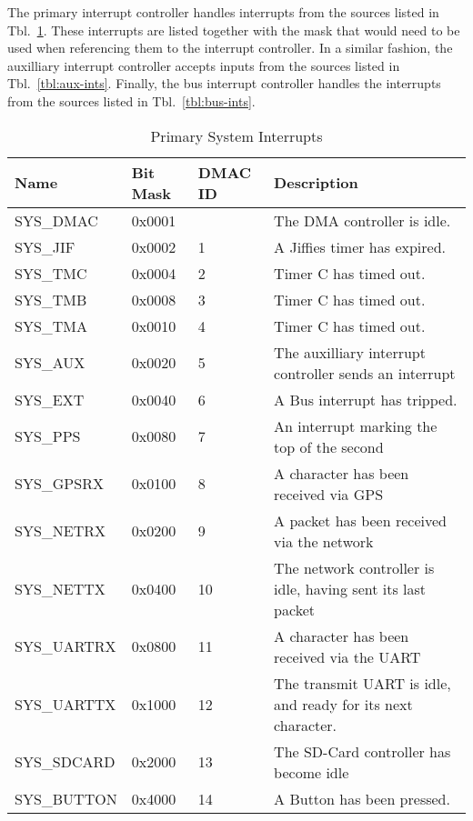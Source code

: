 \documentclass{gqtekspec}
\begin{document}
The primary interrupt controller handles interrupts from the sources listed
in Tbl.~\ref{tbl:sys-ints}.  These interrupts are listed together with the
mask that would need to be used when referencing them to the interrupt
controller.  In a similar fashion, the auxilliary interrupt controller accepts
inputs from the sources listed in Tbl.~\ref{tbl:aux-ints}.  Finally, the
bus interrupt controller handles the interrupts from the sources listed in
Tbl.~\ref{tbl:bus-ints}.

\begin{table}[htbp]
\begin{center}\begin{tabular}{|p{0.9in}|p{0.75in}|p{0.75in}|p{3.00in}|}\hline
\rowcolor[gray]{0.85} Name & Bit Mask & DMAC ID &Description \\\hline\hline
SYS\_DMAC  & 0x0001 && The DMA controller is idle.\\\hline
SYS\_JIF   & 0x0002 & 1 & A Jiffies timer has expired.\\\hline
SYS\_TMC   & 0x0004 & 2 & Timer C has timed out.\\\hline
SYS\_TMB   & 0x0008 & 3 & Timer C has timed out.\\\hline
SYS\_TMA   & 0x0010 & 4 & Timer C has timed out.\\\hline
SYS\_AUX   & 0x0020 & 5 & The auxilliary interrupt controller sends an interrupt\\\hline
SYS\_EXT   & 0x0040 & 6 & A Bus interrupt has tripped. \\\hline
SYS\_PPS   & 0x0080 & 7 & An interrupt marking the top of the second\\\hline
SYS\_GPSRX & 0x0100 & 8& A character has been received via GPS\\\hline
SYS\_NETRX & 0x0200 & 9 & A packet has been received via the network\\\hline
SYS\_NETTX & 0x0400 & 10 & The network controller is idle, having sent its
			last packet\\\hline
SYS\_UARTRX & 0x0800 & 11 & A character has been received via the UART\\\hline
SYS\_UARTTX & 0x1000 & 12 & The transmit UART is idle, and ready for its next
		character.\\\hline
SYS\_SDCARD & 0x2000 & 13 & The SD-Card controller has become idle\\\hline
SYS\_BUTTON & 0x4000 & 14 & A Button has been pressed. \\\hline
\end{tabular}
\caption{Primary System Interrupts}\label{tbl:sys-ints}
\end{center}\end{table}
\end{document}
